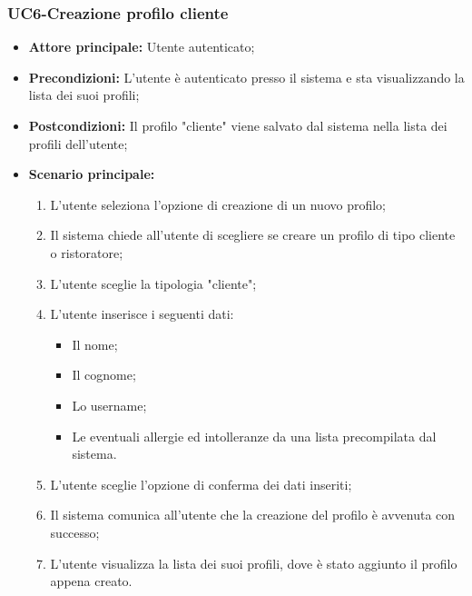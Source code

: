 \subsubsection{UC6-Creazione profilo cliente}
\begin{itemize}
    \item \textbf{Attore principale:} Utente autenticato;
    \item \textbf{Precondizioni:} L'utente è autenticato presso il sistema e sta visualizzando la lista dei suoi profili;
    \item \textbf{Postcondizioni:} Il profilo "cliente" viene salvato dal sistema nella lista dei profili dell'utente;
    \item \textbf{Scenario principale:}
    \begin{enumerate}
        \item L'utente seleziona l'opzione di creazione di un nuovo profilo;
        \item Il sistema chiede all'utente di scegliere se creare un profilo di tipo cliente o ristoratore;
        \item L'utente sceglie la tipologia "cliente";
        \item L'utente inserisce i seguenti dati:
        \begin{itemize}
            \item Il nome;
            \item Il cognome;
            \item Lo username;
            \item Le eventuali allergie ed intolleranze da una lista precompilata dal sistema.
        \end{itemize}
        \item L'utente sceglie l'opzione di conferma dei dati inseriti;
        \item Il sistema comunica all'utente che la creazione del profilo è avvenuta con successo;
        \item L'utente visualizza la lista dei suoi profili, dove è stato aggiunto il profilo appena creato.
    \end{enumerate}
\end{itemize}

